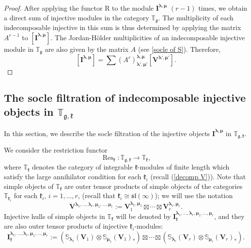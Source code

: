\documentclass[12pt,oneside,english]{amsart}
\numberwithin{equation}{section}
\numberwithin{figure}{section}
\theoremstyle{plain}
\theoremstyle{plain}
\theoremstyle{remark}
\theoremstyle{definition}
\theoremstyle{plain}
\theoremstyle{remark}
\theoremstyle{definition}
\theoremstyle{plain}
\theoremstyle{plain}
\theoremstyle{definition}
\newcommand{\bV}{\mathbf{V}}
\newcommand{\bI}{\mathbf{I}}
\newcommand{\fg}{\mathfrak{g}}
\newcommand{\fk}{\mathfrak{k}}
\newcommand{\Res}{\operatorname{Res}}
\begin{document}
\begin{proof}
After applying the functor $\mathrm{R}$ to the module $\bI^{\boldsymbol{\lambda},{\boldsymbol{\mu}}}$ $(r-1)$ times, we obtain a direct sum of injective modules in the  category $\mathbb T_{\fg}$. The multiplicity of each indecomposable injective in this sum is thus determined by applying the matrix $A^{r-1}$ to $[\bI^{\boldsymbol{\lambda},{\boldsymbol{\mu}}}]$. The  Jordan-H\"older multiplicities of an indecomposable injective module in $\mathbb T_{\fg}$ are also given by the matrix $A$ (see \ref{socle of S}). Therefore,
$$
[\bI^{\boldsymbol{\lambda},{\boldsymbol{\mu}}}]=\sum (A^r)_{\boldsymbol{\lambda}',{\boldsymbol{\mu}}'}^{\boldsymbol{\lambda},{\boldsymbol{\mu}}}[\bV^{\boldsymbol{\lambda}',{\boldsymbol{\mu}}'}].
$$
\end{proof}




\subsection{The socle filtration of indecomposable injective objects in $\mathbb T_{\fg,\fk}$}

In this section, we describe the socle filtration of the injective objects $\bI^{\boldsymbol{\lambda},{\boldsymbol{\mu}}}$ in  $\mathbb T_{\fg,\fk}$.

We consider the restriction functor $$\Res_{\fk}:\mathbb T_{\fg,\fk} \rightarrow \mathbb T_{\fk},$$
where $\mathbb T_{\fk}$ denotes the category of integrable $\fk$-modules of finite length which satisfy the large annihilator condition for each $\fk_i$ (recall (\ref{decomp V})).
  Note that simple objects of $\mathbb T_{\fk}$ are outer tensor products of simple objects of the categories $\mathbb T_{\fk_i}$ for each $\fk_i$, $i=1,\ldots,r$, (recall that $\fk_i\cong\mathfrak{sl}(\infty)$); we will use the notation
    $$\bV^{\boldsymbol{\lambda}_1,\dots,\boldsymbol{\lambda}_r,{\boldsymbol{\mu}}_1,\dots,{\boldsymbol{\mu}}_r}:=\bV_1^{\boldsymbol{\lambda}_1,{\boldsymbol{\mu}}_1}\boxtimes\cdots\boxtimes\bV_r^{\boldsymbol{\lambda}_r,{\boldsymbol{\mu}}_r}.$$
    Injective hulls of simple objects in $\mathbb T_{\fk}$ will be denoted by $\bI_{\fk}^{\boldsymbol{\lambda}_1,\dots,\boldsymbol{\lambda}_r,{\boldsymbol{\mu}}_1,\dots,{\boldsymbol{\mu}}_r}$, and they are also outer tensor products of injective $\fk_i$-modules:
    $$\bI_{\fk}^{\boldsymbol{\lambda}_1,\dots,\boldsymbol{\lambda}_r,{\boldsymbol{\mu}}_1,\dots,{\boldsymbol{\mu}}_r}:=\left(\mathbb{S}_{\boldsymbol{\lambda}_1}(\bV_1)\otimes \mathbb{S}_{{\boldsymbol{\mu}}_1}(\bV_1)_*\right)\boxtimes\cdots\boxtimes \left(\mathbb{S}_{\boldsymbol{\lambda}_r}(\bV_r)
    \otimes \mathbb{S}_{{\boldsymbol{\mu}}_r}(\bV_r)_*\right).$$
\end{document}

